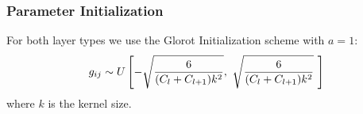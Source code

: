\subsubsection{Parameter Initialization}
For both layer types we use the Glorot Initialization scheme \cite{glorot_understanding_2010}
with $a=1$: 
%
\begin{equation}
  g_{ij} \sim U\left[ -\sqrt{\frac{6}{(C_l + C_{l+1})k^2}},\ \sqrt{\frac{6}{(C_l + C_{l+1})k^2}}\
  \right] \label{eq:ch6:glorot}
\end{equation}
where $k$ is the kernel size.
% 
